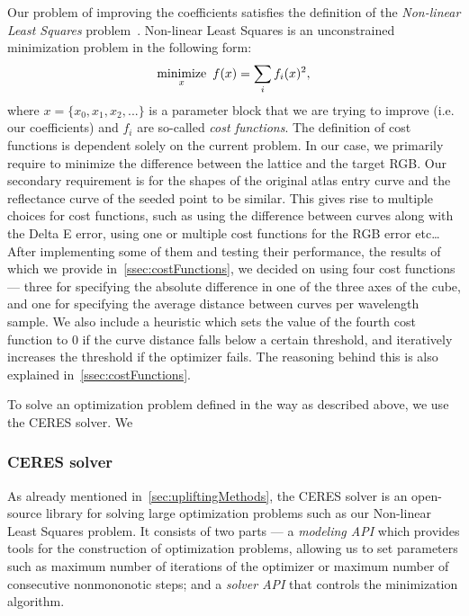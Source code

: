 Our problem of improving the coefficients satisfies the definition of the \emph{Non-linear Least Squares} problem~\cite{nonLinearLeastSquares}. Non-linear Least Squares is an unconstrained minimization problem in the following form:
\begin{equation} \label{eq:nonLinearLeastSquares}
\underset{x}{\text{minimize}} \hspace{0.5em} f(x) = \sum_{i} f_{i}(x)^{2},
\end{equation}
where $x= \{x_{0}, x_{1}, x_{2}, ... \}$ is a parameter block that we are trying to improve (i.e. our coefficients) and $f_{i}$ are so-called \emph{cost functions}. The definition of cost functions is dependent solely on the current problem. In our case, we primarily require to minimize the difference between the lattice and the target RGB. Our secondary requirement is for the shapes of the original atlas entry curve and the reflectance curve of the seeded point to be similar. This gives rise to multiple choices for cost functions, such as using the difference between curves along with the Delta E error, using one or multiple cost functions for the RGB error etc\ldots After implementing some of them and testing their performance, the results of which we provide in~\cref{ssec:costFunctions}, we decided on using four cost functions --- three for specifying the absolute difference in one of the three axes of the cube, and one for specifying the average distance between curves per wavelength sample. We also include a heuristic which sets the value of the fourth cost function to 0 if the curve distance falls below a certain threshold, and iteratively increases the threshold if the optimizer fails. The reasoning behind this is also explained in~\cref{ssec:costFunctions}.

To solve an optimization problem defined in the way as described above, we use the CERES solver. We 

\subsubsection{CERES solver} \label{sssec:ceresSolver}

As already mentioned in~\cref{sec:upliftingMethods}, the CERES solver is an open-source library for solving large optimization problems such as our Non-linear Least Squares problem. It consists of two parts --- a \emph{modeling API} which provides tools for the construction of optimization problems, allowing us to set parameters such as maximum number of iterations of the optimizer or maximum number of consecutive nonmononotic steps; and a \emph{solver API} that controls the minimization algorithm.

